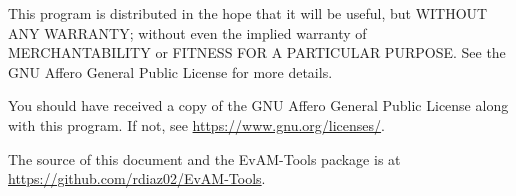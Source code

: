 \documentclass[a4paper,11pt]{article}
\begin{document}
This program is distributed in the hope that it will be useful, but WITHOUT ANY WARRANTY; without even the implied warranty of MERCHANTABILITY or FITNESS FOR A PARTICULAR PURPOSE. See the GNU Affero General Public License for more details.

You should have received a copy of the GNU Affero General Public License along with this program. If not, see \url{https://www.gnu.org/licenses/}. 

The source of this document and the EvAM-Tools package is at \url{https://github.com/rdiaz02/EvAM-Tools}.



\end{document}
